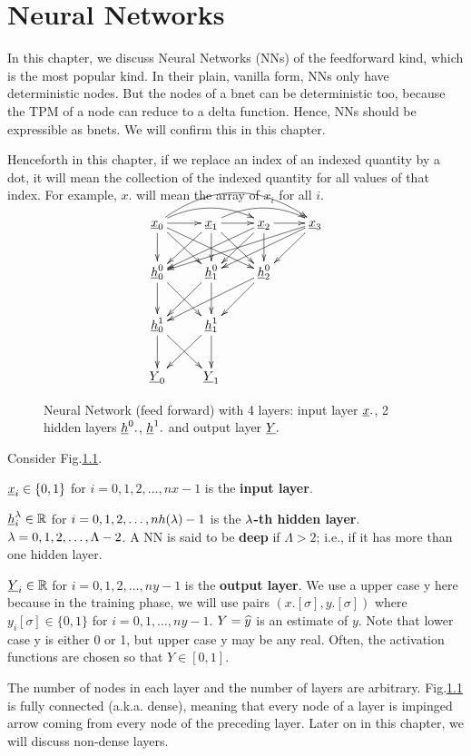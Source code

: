 \chapter{Neural Networks}\label{ch-nn}

In this chapter, we discuss
 Neural Networks (NNs) of the
feedforward kind,
which is the most popular kind. In their
 plain, vanilla form, NNs only
have deterministic nodes.
But the nodes of a bnet can
be deterministic too, because
the TPM
of a node
can reduce to a delta function.
Hence, NNs should be expressible
as bnets. We will confirm this
in this chapter.

Henceforth in this chapter,
if we replace an index of an
indexed quantity by a dot,
it will mean the collection
of the indexed quantity
for all values of that
index. For example, $x.$
will mean the
array of $x_i$ for all $i$.


\begin{figure}[h!]
\centering
$$\xymatrix{
\rvx_0\ar@/^1pc/[rr]
\ar@/^2pc/[rrr]
\ar[d]\ar[dr]\ar[drr]\ar[r]&
\rvx_1\ar@/^1pc/[rr]
 \ar[dl]\ar[d]\ar[dr]\ar[r]&
\rvx_2\ar[dll]\ar[dl]\ar[d]\ar[r]&
\rvx_3\ar[dlll]\ar[dll]\ar[dl]\\
\rvh_0^0\ar[d]\ar[dr]&
\rvh_1^0\ar[dl]\ar[d]&
\rvh_2^0\ar[dll]\ar[dl]\\
\rvh_0^1\ar[d]\ar[dr]&
\rvh_1^1\ar[dl]\ar[d]\\
\rvY_0&
\rvY_1
}$$
\caption{Neural Network (feed forward)
with 4 layers: input layer ${\underline{x}}.$,
2 hidden layers ${\underline{h}}^0.$,
${\underline{h}}^1.$ and
output layer ${\underline{Y}}.$ }
\label{fig-nn}
\end{figure}

Consider Fig.\ref{fig-nn}.

${\underline{x}}_i\in
\{0,1\}$ for
$i=0, 1, 2, \dots,nx-1$
is the \textbf{input layer}.

${\underline{h}}_i^\lambda\in { \mathbb{R}}$ for
$i=0, 1, 2, \dots,nh(\lambda)-1$
is the $\lambda$\textbf{-th hidden layer}.
$\lambda=0, 1, 2, \ldots, \Lambda-2$.
A NN is said to be {\bf deep} if
$\Lambda>2$; i.e., if it has
more than one hidden layer.

${\underline{Y}}_i\in { \mathbb{R}}$ for
$i=0, 1, 2, \dots,ny-1$
is the \textbf{output layer}.
We use a upper case y
here because in the training phase,
we will use pairs $(x.[\sigma],y.[\sigma])$ where
$y_i[\sigma]\in \{0,1\}$
for $i=0, 1, \ldots, ny-1$.
$Y={\widehat{y}}$
is an estimate of $y$.
Note that lower case y is
either 0 or 1,
but upper case y may be
any real. Often, the
activation
functions are chosen so that
$Y\in[0,1]$.


The number of nodes in each layer
and the number of layers are arbitrary.
Fig.\ref{fig-nn} is fully connected
(a.k.a. dense), meaning that every node
of a layer is impinged
arrow coming
from every node of the preceding
layer. Later on in this chapter,
we will
discuss non-dense layers.

